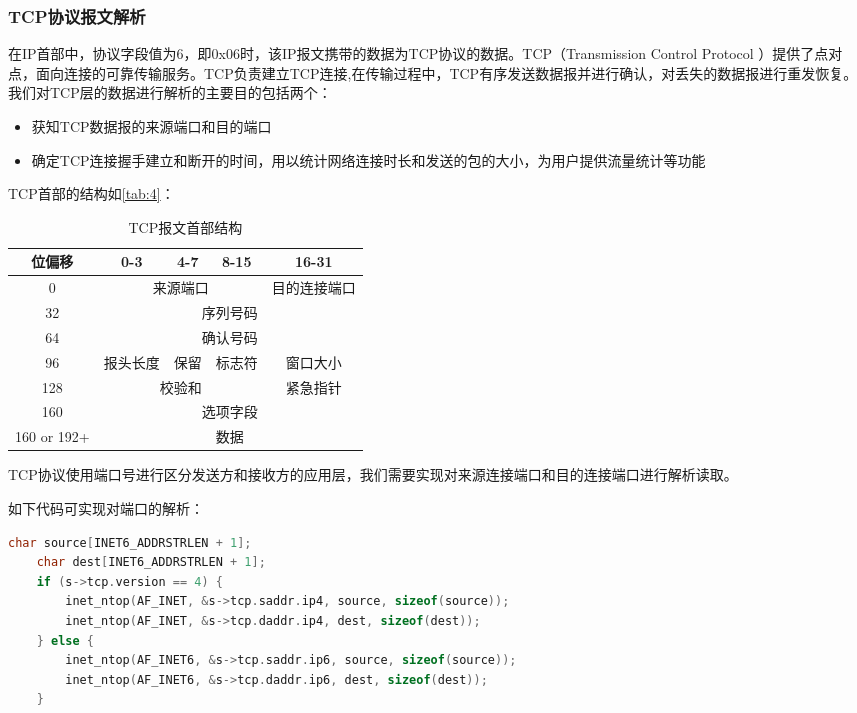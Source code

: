 \documentclass[format=final, language=chinese, degree=fyp]{hustthesis}
\begin{document}
\subsubsection{TCP协议报文解析}

在IP首部中，协议字段值为6，即0x06时，该IP报文携带的数据为TCP协议的数据。TCP（Transmission Control Protocol ）提供了点对点，面向连接的可靠传输服务。TCP负责建立TCP连接,在传输过程中，TCP有序发送数据报并进行确认，对丢失的数据报进行重发恢复。我们对TCP层的数据进行解析的主要目的包括两个：
    
    \begin{itemize}
       	\item 获知TCP数据报的来源端口和目的端口
       	\item 确定TCP连接握手建立和断开的时间，用以统计网络连接时长和发送的包的大小，为用户提供流量统计等功能
    \end{itemize}
    
TCP首部的结构如\autoref{tab:4}：

\begin{table}[h!]
\centering
\caption{TCP报文首部结构}\label{tab:4}
\begin{tabular}{|c|c|c|c|c|}
	\hline
	位偏移 & 0-3 & 4-7 & 8-15 & 16-31\\\hline
	0 & \multicolumn{3}{c|}{来源端口} & 目的连接端口 \\\hline
	32 & \multicolumn{4}{c|}{序列号码}  \\\hline
	64 & \multicolumn{4}{c|}{确认号码}  \\\hline
	96 & 报头长度 & 保留 & 标志符 & 窗口大小 \\	\hline
	128 & \multicolumn{3}{c|}{校验和} & 紧急指针 \\\hline
	160 & \multicolumn{4}{c|}{选项字段} \\\hline
	160 or 192+ & \multicolumn{4}{c|}{数据}\\\hline
\end{tabular}
\end{table}

TCP协议使用端口号进行区分发送方和接收方的应用层，我们需要实现对来源连接端口和目的连接端口进行解析读取。

如下代码可实现对端口的解析：

\begin{lstlisting}[language=c]
    char source[INET6_ADDRSTRLEN + 1];
    char dest[INET6_ADDRSTRLEN + 1];
    if (s->tcp.version == 4) {
        inet_ntop(AF_INET, &s->tcp.saddr.ip4, source, sizeof(source));
        inet_ntop(AF_INET, &s->tcp.daddr.ip4, dest, sizeof(dest));
    } else {
        inet_ntop(AF_INET6, &s->tcp.saddr.ip6, source, sizeof(source));
        inet_ntop(AF_INET6, &s->tcp.daddr.ip6, dest, sizeof(dest));
    }
\end{lstlisting}
\end{document}
